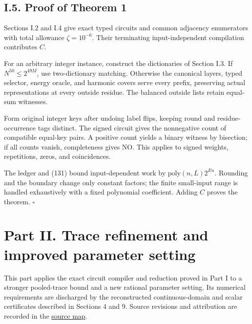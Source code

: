 \hypertarget{af-a9ec399514-i.5.-proof-of-theorem-1}{%
\subsection{I.5. Proof of Theorem 1}\label{af-a9ec399514-i.5.-proof-of-theorem-1}}

Sections I.2 and I.4 give exact typed circuits and common adjacency enumerators with total allowance \(\zeta=10^{-6}\). Their terminating input-independent compilation contributes \(C\).

For an arbitrary integer instance, construct the dictionaries of Section I.3. If \(N^{50}\le2^{49M}\), use two-dictionary matching. Otherwise the canonical layers, typed selector, energy oracle, and harmonic covers serve every prefix, preserving actual representations at every outside residue. The balanced outside lists retain equal-sum witnesses.

Form original integer keys after undoing label flips, keeping round and residue-occurrence tags distinct. The signed circuit gives the nonnegative count of compatible equal-key pairs. A positive count yields a binary witness by bisection; if all counts vanish, completeness gives NO. This applies to signed weights, repetitions, zeros, and coincidences.

The ledger and (131) bound input-dependent work by \(\mathrm{poly}(n,L)2^{En}\). Rounding and the boundary change only constant factors; the finite small-input range is handled exhaustively with a fixed polynomial coefficient. Adding \(C\) proves the theorem. \(\square\)

\hypertarget{af-a9ec399514-part-ii.-trace-refinement-and-improved-parameter-setting}{%
\section{Part II. Trace refinement and improved parameter setting}\label{af-a9ec399514-part-ii.-trace-refinement-and-improved-parameter-setting}}

This part applies the exact circuit compiler and reduction proved in Part I to a stronger pooled-trace bound and a new rational parameter setting. Its numerical requirements are discharged by the reconstructed continuous-domain and scalar certificates described in Sections 4 and 9. Source revisions and attribution are recorded in the \href{https://github.com/icekylinx/algorithm-frontier/blob/main/problems/subset-sum-fast-deterministic/sources.md}{source map}.

